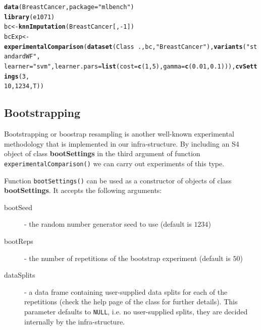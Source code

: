 \documentclass[10pt,a4paper]{article}\usepackage[]{graphicx}\usepackage[]{color}
\makeatletter
\newcommand{\hlnum}[1]{\textcolor[rgb]{0.686,0.059,0.569}{#1}}%
\newcommand{\hlstr}[1]{\textcolor[rgb]{0.192,0.494,0.8}{#1}}%
\newcommand{\hlopt}[1]{\textcolor[rgb]{0,0,0}{#1}}%
\newcommand{\hlstd}[1]{\textcolor[rgb]{0.345,0.345,0.345}{#1}}%
\newcommand{\hlkwb}[1]{\textcolor[rgb]{0.69,0.353,0.396}{#1}}%
\newcommand{\hlkwc}[1]{\textcolor[rgb]{0.333,0.667,0.333}{#1}}%
\newcommand{\hlkwd}[1]{\textcolor[rgb]{0.737,0.353,0.396}{\textbf{#1}}}%
\newenvironment{kframe}{%
 \def\at@end@of@kframe{}%
 \ifinner\ifhmode%
  \def\at@end@of@kframe{\end{minipage}}%
  \begin{minipage}{\columnwidth}%
 \fi\fi%
 \def\FrameCommand##1{\hskip\@totalleftmargin \hskip-\fboxsep
 \colorbox{shadecolor}{##1}\hskip-\fboxsep
     \hskip-\linewidth \hskip-\@totalleftmargin \hskip\columnwidth}%
 \MakeFramed {\advance\hsize-\width
   \@totalleftmargin\z@ \linewidth\hsize
   \@setminipage}}%
 {\par\unskip\endMakeFramed%
 \at@end@of@kframe}
\newenvironment{knitrout}{}{} %
\makeatother
\begin{document}
\begin{knitrout}
\color{fgcolor}\begin{kframe}
\begin{alltt}
\hlkwd{data}\hlstd{(BreastCancer,} \hlkwc{package} \hlstd{=} \hlstr{"mlbench"}\hlstd{)}
\hlkwd{library}\hlstd{(e1071)}
\hlstd{bc} \hlkwb{<-} \hlkwd{knnImputation}\hlstd{(BreastCancer[,} \hlopt{-}\hlnum{1}\hlstd{])}
\hlstd{bcExp} \hlkwb{<-} \hlkwd{experimentalComparison}\hlstd{(}\hlkwd{dataset}\hlstd{(Class} \hlopt{~} \hlstd{., bc,} \hlstr{"BreastCancer"}\hlstd{),} \hlkwd{variants}\hlstd{(}\hlstr{"standardWF"}\hlstd{,}
    \hlkwc{learner} \hlstd{=} \hlstr{"svm"}\hlstd{,} \hlkwc{learner.pars} \hlstd{=} \hlkwd{list}\hlstd{(}\hlkwc{cost} \hlstd{=} \hlkwd{c}\hlstd{(}\hlnum{1}\hlstd{,} \hlnum{5}\hlstd{),} \hlkwc{gamma} \hlstd{=} \hlkwd{c}\hlstd{(}\hlnum{0.01}\hlstd{,} \hlnum{0.1}\hlstd{))),} \hlkwd{cvSettings}\hlstd{(}\hlnum{3}\hlstd{,}
    \hlnum{10}\hlstd{,} \hlnum{1234}\hlstd{, T))}
\end{alltt}
\end{kframe}
\end{knitrout}


\subsection{Bootstrapping}

Bootstrapping or boostrap resampling is another well-known
experimental methodology that is implemented in our
infra-structure. By including an S4 object of class
\textbf{bootSettings} in the third argument of function
\texttt{experimentalComparison()} we can carry out experiments of this
type.

Function \texttt{bootSettings()} can be used as a constructor of
objects of class \textbf{bootSettings}. It accepts the following
arguments:

\begin{description}
\item[bootSeed] - the random number generator seed to use (default is $1234$)
\item[bootReps] - the number of repetitions of the bootstrap experiment (default is $50$)
\item[dataSplits] - a data frame containing user-supplied data splits
  for each of the repetitions (check the help page of the
  class for further details). This parameter defaults to
  \texttt{NULL}, i.e. no user-supplied splits, they are decided
  internally by the infra-structure.
\end{description}
\end{document}
